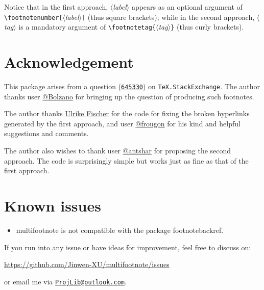 \documentclass[classical]{einfart}
\newcommand{\meta}[1]{$\langle${\normalfont\itshape#1}$\rangle$}
\newenvironment{tip}[1][Tip]
  {%
    \LocallyStopLineNumbers%
    \begin{tcolorbox}[breakable,
        enhanced,
        width = \textwidth,
        colback = paper, colbacktitle = paper,
        colframe = gray!50, boxrule=0.2mm,
        coltitle = black,
        fonttitle = \sffamily,
        attach boxed title to top left = {yshift=-\tcboxedtitleheight/2, xshift=.5cm},
        boxed title style = {boxrule=0pt, colframe=paper},
        before skip = 3mm,
        after skip = 3mm,
        top = 2.5mm,
        bottom = 1.5mm,
        title={\scshape\sffamily #1}]%
  }
  {%
    \end{tcolorbox}%
    \ResumeLineNumbers%
  }
\newcommand{\multifootnotepackage}{{\normalfont\textsf{multifootnote}}}
\begin{document}
\begin{tip}[Attention]
    Notice that in the first approach, \meta{label} appears as an optional argument of \lstinline|\footnotenumber[|\meta{label}\lstinline|]| (thus square brackets); while in the second approach, \meta{tag} is a mandatory argument of \lstinline|\footnotetag{|\meta{tag}\lstinline|}| (thus curly brackets).
\end{tip}


\bigskip
\section{Acknowledgement}

This package arises from a question (\href{https://tex.stackexchange.com/q/645330}{\texttt{645330}}) on \texttt{TeX.StackExchange}. The author thanks user \href{https://tex.stackexchange.com/users/270985}{\textsf{@Bolzano}} for bringing up the question of producing such footnotes.

The author thanks \href{https://tex.stackexchange.com/users/2388}{\textsf{Ulrike Fischer}} for the code for fixing the broken hyperlinks generated by the first approach, and user \href{https://tex.stackexchange.com/users/73317}{\textsf{@frougon}} for his kind and helpful suggestions and comments.

The author also wishes to thank user \href{https://tex.stackexchange.com/users/213149}{\textsf{@antshar}} for proposing the second approach. The code is surprisingly simple but works just as fine as that of the first approach.

\section{Known issues}

\begin{itemize}
    \item \multifootnotepackage{} is not compatible with the package \textsf{footnotebackref}.
\end{itemize}

\medskip
If you run into any issue or have ideas for improvement, feel free to discuss on:
\begin{center}
    \url{https://github.com/Jinwen-XU/multifootnote/issues}
\end{center}
or email me via \href{mailto:ProjLib@outlook.com}{\texttt{ProjLib@outlook.com}}.
\end{document}
